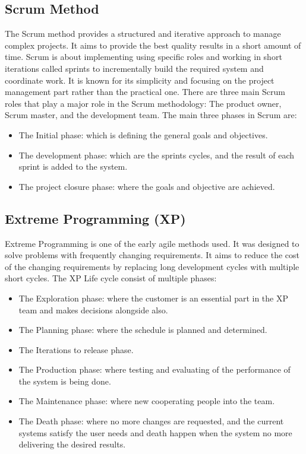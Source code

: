 \documentclass[conference,onecolumn]{IEEEtran}
\begin{document}
\subsection{Scrum Method}
The Scrum method provides a structured and iterative approach to manage complex projects. It aims to provide the best quality results in a short amount of time. Scrum is about implementing using specific roles and working in short iterations called sprints to incrementally build the required system and coordinate work. It is known for its simplicity and focusing on the project management part rather than the practical one. There are three main Scrum roles that play a major role in the Scrum methodology: The product owner, Scrum master, and the development team.
The main three phases in Scrum are:

\begin{itemize}
	\item The Initial phase: which is defining the general goals and objectives.
	\item The development phase: which are the sprints cycles, and the result of each sprint is added to the system.
	\item The project closure phase: where the goals and objective are achieved.
\end{itemize}

\subsection{Extreme Programming (XP)}
Extreme Programming is one of the early agile methods used. It was designed to solve problems with frequently changing requirements. It aims to reduce the cost of the changing requirements by replacing long development cycles with multiple short cycles. The XP Life cycle consist of multiple phases:

\begin{itemize}
	\item The Exploration phase: where the customer is an essential part in the XP team and makes decisions alongside also.
	\item The Planning phase: where the schedule is planned and determined.
	\item The Iterations to release phase.
	\item The Production phase: where testing and evaluating of the performance of the system is being done.
	\item The Maintenance phase: where new cooperating people into the team.
	\item The Death phase: where no more changes are requested, and the current systems satisfy the user needs and death happen when the system no more delivering the desired results.
\end{itemize}
\end{document}
